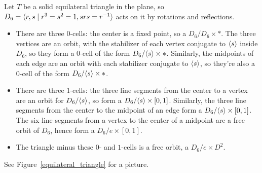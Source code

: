 \begin{exm}
\label{triangle_exm}
Let $T$ be a solid equilateral triangle in the plane, so $D_6 = \langle r,s\mid r^3 = s^2 = 1, srs = r^{-1}\rangle$ acts on
it by rotations and reflections.
\begin{itemize}
	\item There are three $0$-cells: the center is a fixed point, so a $D_6/D_6\times *$. The three vertices are
	an orbit, with the stabilizer of each vertex conjugate to $\langle s\rangle$ inside $D_6$, so they form a $0$-cell of the
	form $D_6/\langle s\rangle\times *$. Similarly, the midpoints of each edge are an orbit with each stabilizer conjugate to
	$\langle s\rangle$, so they're also a $0$-cell of the form $D_6/\langle s\rangle\times *$.
	\item There are three $1$-cells: the three line segments from the center to a vertex are an orbit for $D_6/\langle s\rangle$, so form a $D_6/\langle s\rangle\times[0,1]$. Similarly, the three line segments from the center to the midpoint of an
	edge form a $D_6/\langle s\rangle\times[0,1]$. The six line segments from a vertex to the center of a midpoint are a free
	orbit of $D_6$, hence form a $D_6/e\times[0,1]$.
	\item The triangle minus these $0$- and $1$-cells is a free orbit, a $D_6/e\times D^2$.
\end{itemize}
See Figure~\ref{equilateral_triangle} for a picture.
\end{exm}
